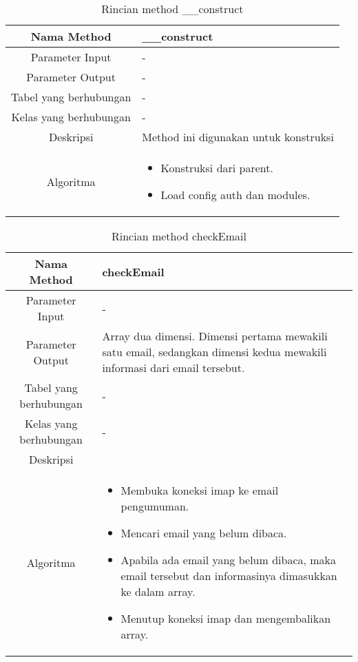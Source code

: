 \begin{center}
	\begin{table}[H]
	\caption{Rincian method \_\_construct}
	\label{table:pengumuman-model-construct}
\begin{tabular}{|c|p{11cm}|}
\hline
Nama Method 	& 	 	\_\_construct \\
\hline
Parameter Input & - \\
\hline
Parameter Output & - \\
\hline
Tabel yang berhubungan & -\\
\hline
Kelas yang berhubungan &  - \\
\hline
Deskripsi	& Method ini digunakan untuk konstruksi\\
\hline
Algoritma	& \begin{itemize}
				\item Konstruksi dari parent.
				\item Load config auth dan modules.
				\end{itemize} \\
\hline
\end{tabular}
\end{table}
\end{center}

\begin{center}
	\begin{table}[H]
	\caption{Rincian method checkEmail}
	\label{table:pengumuman-model-checkemail}
\begin{tabular}{|c|p{11cm}|}
\hline
Nama Method 	& 	 	checkEmail\\
\hline
Parameter Input & - \\
\hline
Parameter Output & Array dua dimensi. Dimensi pertama mewakili satu email, sedangkan dimensi kedua mewakili informasi dari email tersebut.\\
\hline
Tabel yang berhubungan & - \\
\hline
Kelas yang berhubungan & - \\
\hline
Deskripsi	& \\
\hline
Algoritma	& \begin{itemize}
				\item Membuka koneksi imap ke email pengumuman.
				\item Mencari email yang belum dibaca.
				\item Apabila ada email yang belum dibaca, maka email tersebut dan informasinya dimasukkan ke dalam array.
				\item Menutup koneksi imap dan mengembalikan array.
				\end{itemize} \\
\hline
\end{tabular}
\end{table}
\end{center}

